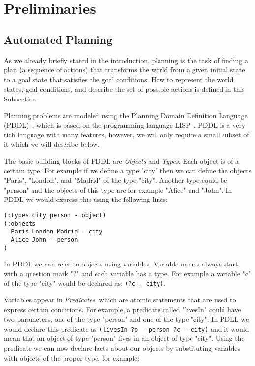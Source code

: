 \documentclass[runningheads]{llncs}
\begin{document}
\section{Preliminaries}

\subsection{Automated Planning}
As we already briefly stated in the introduction, planning is the task of finding a plan (a sequence of
actions) that transforms the world from a given initial state to a goal state that satisfies the
goal conditions. How to represent the world states, goal conditions, and describe the set of possible actions is
defined in this Subsection.

Planning problems are modeled using the Planning Domain Definition Language (PDDL)~\cite{haslumIntroductionPlanningDomain2019a}, which is
based on the programming language LISP~\cite{lisp86}. PDDL is a very rich language with many features, however, we
will only require a small subset of it which we will describe below.

The basic building blocks of PDDL are \emph{Objects} and \emph{Types}. Each object is of a certain
type. For example if we define a type "city" then we can define the objects "Paris", "London", and "Madrid" of
the type "city". Another type could be "person" and the objects of this type are for example "Alice" and "John".
In PDDL we would express this using the following lines:

\begin{verbatim}
(:types city person - object)
(:objects
  Paris London Madrid - city
  Alice John - person
)
\end{verbatim}

In PDDL we can refer to objects using variables. Variable names always start with a question mark "?" and each
variable has a type. For example a variable "c" of the type "city" would be declared as: \verb _(?c - city)_.

Variables appear in \emph{Predicates}, which are atomic statements that are used to express certain
conditions. For example, a predicate called "livesIn" could have two parameters, one of the type "person"
and one of the type "city". In PDLL we would declare this predicate as \verb _(livesIn ?p - person ?c - city)_
and it would mean that an object of type "person" lives in an object of type "city". Using the predicate
we can now declare facts about our objects by substituting variables with objects of the proper type, for example:
\end{document}
